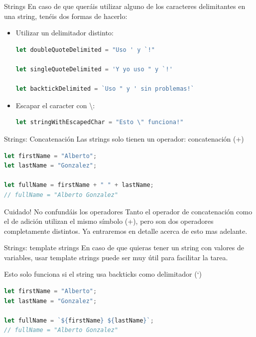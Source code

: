 \documentclass{beamer}
\begin{document}
\begin{frame}[fragile]{Strings}
En caso de que queráis utilizar alguno de los caracteres delimitantes en una string, tenéis dos formas de hacerlo:\pause
\begin{itemize}
\item Utilizar un delimitador distinto: 
\begin{lstlisting}[language=JavaScript]
let doubleQuoteDelimited = "Uso ' y `!"

let singleQuoteDelimited = 'Y yo uso " y `!'

let backtickDelimited = `Uso " y ' sin problemas!`
\end{lstlisting}\pause
\item Escapar el caracter con \textbackslash:
\begin{lstlisting}[language=JavaScript]
let stringWithEscapedChar = "Esto \" funciona!"
\end{lstlisting}
\end{itemize}
\end{frame}

\begin{frame}[fragile]{Strings: Concatenación}
Las strings solo tienen un operador: concatenación (+)
\begin{lstlisting}[language=JavaScript]
let firstName = "Alberto";
let lastName = "Gonzalez";

let fullName = firstName + " " + lastName;
// fullName = "Alberto Gonzalez"
\end{lstlisting}\pause
\begin{block}{Cuidado! No confundáis los operadores}
Tanto el operador de concatenación como el de adición utilizan el mismo símbolo (+), pero son dos operadores completamente distintos. Ya entraremos en detalle acerca de esto mas adelante.
\end{block}
\end{frame}

\begin{frame}[fragile]{Strings: template strings}
En caso de que quieras tener un string con valores de variables, usar template strings puede ser muy útil para facilitar la tarea.\pause

Esto solo funciona si el string usa backticks como delimitador (`)\bigskip\pause

\begin{lstlisting}[language=JavaScript]
let firstName = "Alberto";
let lastName = "Gonzalez";

let fullName = `${firstName} ${lastName}`;
// fullName = "Alberto Gonzalez"
\end{lstlisting}
\end{frame}
\end{document}

